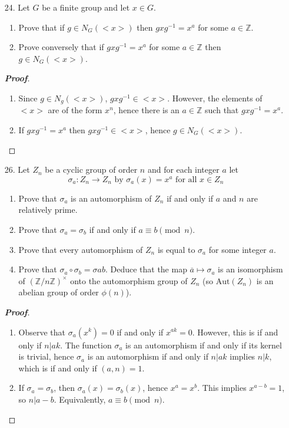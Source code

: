 \documentclass[12pt,leqno]{book}
\theoremstyle{definition}
\newcommand{\Z}{\mathbb{Z}}
\newenvironment{Proof}{\begin{proof}[\textnormal{\textbf{Proof}}]}{\end{proof}}
\begin{document}
\begin{enumerate}
 \item [24.] Let $G$ be a finite group and let $x\in G$.
  \begin{enumerate}
   \item Prove that if $g\in N_G(<x>)$ then $gxg^{-1}=x^a$ for some $a\in\Z$.
   \item Prove conversely that if $gxg^{-1}=x^a$ for some $a\in\Z$ then $g\in N_G(<x>)$.
  \end{enumerate}
\begin{Proof}
 \begin{enumerate}
  \item Since $g\in N_g(<x>)$, $gxg^{-1}\in<x>$. However, the elements of $<x>$ are of the form $x^n$, hence there is an $a\in\Z$ such that $gxg^{-1}=x^a$.
  \item If $gxg^{-1}=x^a$ then $gxg^{-1}\in<x>$, hence $g\in N_G(<x>)$.
 \end{enumerate}
\end{Proof}
 \item [26.] Let $Z_n$ be a cyclic group of order $n$ and for each integer $a$ let \[\sigma_a:Z_n\to Z_n\text{   by   }\sigma_a(x)=x^a\text{ for all }x\in Z_n\]
  \begin{enumerate}
   \item Prove that $\sigma_a$ is an automorphism of $Z_n$ if and only if $a$ and $n$ are relatively prime.
   \item Prove that $\sigma_a=\sigma_b$ if and only if $a\equiv b\pmod{n}$.
   \item Prove that every automorphism of $Z_n$ is equal to $\sigma_a$ for some integer $a$.
   \item Prove that $\sigma_a\circ\sigma_b=\sigma{ab}$. Deduce that the map $\overline{a}\mapsto\sigma_a$ is an isomorphism of $\left(\Z/n\Z\right)^{\times}$ onto the automorphism group of $Z_n$ (so $\text{Aut}(Z_n)$ is an abelian group of order $\phi(n)$).
  \end{enumerate}
\begin{Proof}
 \begin{enumerate}
  \item Observe that $\sigma_a(x^k)=0$ if and only if $x^{ak}=0$. However, this is if and only if $n|ak$. The function $\sigma_a$ is an automorphism if and only if its kernel is trivial, hence $\sigma_a$ is an automorphism if and only if $n|ak$ implies $n|k$, which is if and only if $(a,n)=1$.
  \item If $\sigma_a=\sigma_b$, then $\sigma_a(x)=\sigma_b(x)$, hence $x^a=x^b$. This implies $x^{a-b}=1$, so $n|a-b$. Equivalently, $a\equiv b\pmod{n}$. 


\end{enumerate}
\end{Proof}
\end{enumerate}
\end{document}
